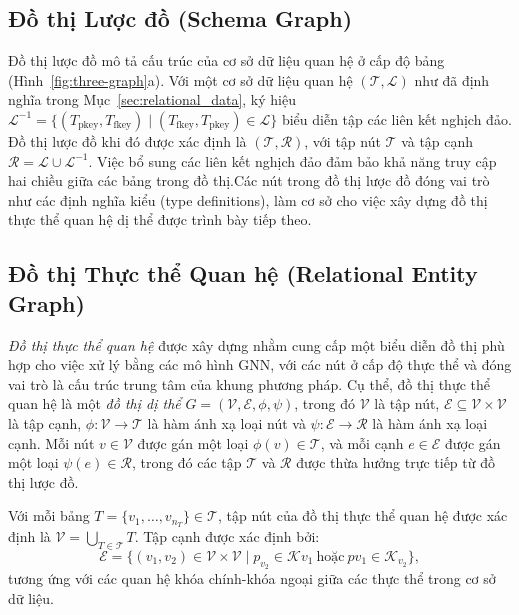 \subsection{Đồ thị Lược đồ (Schema Graph)} \label{sec:schema-graph}
Đồ thị lược đồ mô tả cấu trúc của cơ sở dữ liệu quan hệ ở cấp độ bảng (Hình~\ref{fig:three-graph}a). Với một cơ sở dữ liệu quan hệ $(\mathcal{T}, \mathcal{L})$ như đã định nghĩa trong Mục~\ref{sec:relational_data}, ký hiệu $\mathcal{L}^{-1}=\{(T_{\text{pkey}},T_{\text{fkey}})\mid(T_{\text{fkey}},T_{\text{pkey}})\in\mathcal{L}\}$ biểu diễn tập các liên kết nghịch đảo. Đồ thị lược đồ khi đó được xác định là $(\mathcal{T}, \mathcal{R})$, với tập nút $\mathcal{T}$ và tập cạnh $\mathcal{R}=\mathcal{L}\cup\mathcal{L}^{-1}$. Việc bổ sung các liên kết nghịch đảo đảm bảo khả năng truy cập hai chiều giữa các bảng trong đồ thị.Các nút trong đồ thị lược đồ đóng vai trò như các định nghĩa kiểu (type definitions), làm cơ sở cho việc xây dựng đồ thị thực thể quan hệ dị thể được trình bày tiếp theo.

\subsection{Đồ thị Thực thể Quan hệ (Relational Entity Graph)} \label{sec:relation-graph}
\textit{Đồ thị thực thể quan hệ} được xây dựng nhằm cung cấp một biểu diễn đồ thị phù hợp cho việc xử lý bằng các mô hình GNN, với các nút ở cấp độ thực thể và đóng vai trò là cấu trúc trung tâm của khung phương pháp. Cụ thể, đồ thị thực thể quan hệ là một \textit{đồ thị dị thể} $G=(\mathcal{V},\mathcal{E},\phi,\psi)$, trong đó $\mathcal{V}$ là tập nút, $\mathcal{E}\subseteq\mathcal{V}\times\mathcal{V}$ là tập cạnh, $\phi:\mathcal{V}\rightarrow\mathcal{T}$ là hàm ánh xạ loại nút và $\psi:\mathcal{E}\rightarrow\mathcal{R}$ là hàm ánh xạ loại cạnh. Mỗi nút $v\in\mathcal{V}$ được gán một loại $\phi(v)\in\mathcal{T}$, và mỗi cạnh $e\in\mathcal{E}$ được gán một loại $\psi(e)\in\mathcal{R}$, trong đó các tập $\mathcal{T}$ và $\mathcal{R}$ được thừa hưởng trực tiếp từ đồ thị lược đồ.

Với mỗi bảng $T=\{v_{1},\dots,v_{n_T}\}\in\mathcal{T}$, tập nút của đồ thị thực thể quan hệ được xác định là $\mathcal{V}=\bigcup_{T\in\mathcal{T}}T$. Tập cạnh được xác định bởi:
\begin{equation}
\mathcal{E}=\{(v_1,v_2)\in\mathcal{V}\times\mathcal{V}\mid p_{v_2}\in\mathcal{K}{v_1}\ \text{hoặc}\ p{v_1}\in\mathcal{K}_{v_2}\},
\end{equation}
tương ứng với các quan hệ khóa chính-khóa ngoại giữa các thực thể trong cơ sở dữ liệu.

